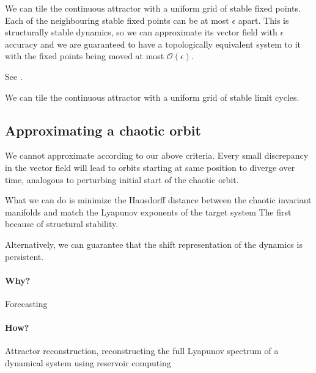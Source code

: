 \documentclass{article}
\theoremstyle{definition}
\theoremstyle{remark}
\newcounter{ct}
\begin{document}
We can tile the continuous attractor with a uniform grid of stable fixed points.
Each of the neighbouring stable fixed points can be at most $\epsilon$ apart.
This is structurally stable dynamics, so we can approximate its vector field with $\epsilon$ accuracy and we are guaranteed to have a topologically equivalent system to it with the fixed points being moved at most $\mathcal{O}(\epsilon)$.

See \citep{Sagodi2024a}.


We can tile the continuous attractor with a uniform grid of stable limit cycles.





\subsection{Approximating a chaotic orbit}
We cannot approximate according to our above criteria.
Every small discrepancy in the vector field will lead to orbits starting at same position to diverge over time, analogous to perturbing initial start of the chaotic orbit.


What we can do is minimize the Hausdorff distance between the chaotic invariant manifolds and match the Lyapunov exponents of the target system
The first because of structural stability.


Alternatively, we can guarantee that the shift representation of the dynamics is persistent.

\paragraph{Why?} 
Forecasting
\citep{jaeger2004harnessing}
\citep{fan2020long}
\citep{vlachas2020backpropagation}
\citep{grigoryeva2024forecasting}

\paragraph{How?}
Attractor reconstruction, reconstructing the full Lyapunov spectrum of a dynamical system using reservoir computing \citep{hart2024attractor}
\end{document}
